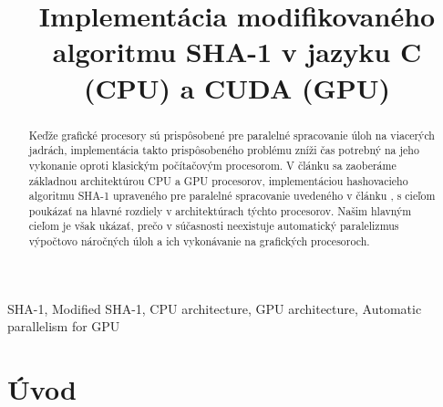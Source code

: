 \documentclass[conference]{IEEEtran}
\begin{document}
%
\title{Implementácia modifikovaného algoritmu SHA-1 v jazyku C (CPU) a CUDA (GPU)}

\author{
}


\maketitle

\begin{abstract}
Keďže grafické procesory sú prispôsobené pre paralelné spracovanie úloh na viacerých jadrách, implementácia takto prispôsobeného problému zníži čas potrebný na jeho vykonanie oproti klasickým počítačovým procesorom. V článku sa zaoberáme základnou architektúrou CPU a GPU procesorov, implementáciou hashovacieho algoritmu SHA-1 upraveného pre paralelné spracovanie uvedeného v článku \cite{MSHA}, s cieľom poukázať na hlavné rozdiely v architektúrach týchto procesorov. Našim hlavným cieľom je však ukázať, prečo v súčasnosti neexistuje automatický paralelizmus výpočtovo náročných úloh a ich vykonávanie na grafických procesoroch.
\end{abstract}

\begin{IEEEkeywords}
SHA-1, Modified SHA-1, CPU architecture, GPU architecture, Automatic parallelism for GPU 
\end{IEEEkeywords}

\IEEEpeerreviewmaketitle

\section{Úvod}
\end{document}
